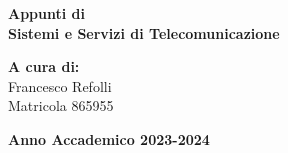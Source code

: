 \documentclass[a4paper,12pt,oneside]{book}
\begin{document}
    
    \begin{titlepage}
        
	\vspace{40mm}
        
	\begin{center}
            {\LARGE{
                    \textbf{Appunti di \\ Sistemi e Servizi di Telecomunicazione}
                    \par
            }}
        \end{center}
        
        \vspace{50mm}

        \begin{flushright}
            {\large \textbf{A cura di:}} \\
            \large{Francesco Refolli} \\
            \large{Matricola 865955} 
        \end{flushright}
        
        \vspace{40mm}
        \begin{center}
            {\large{\bf Anno Accademico 2023-2024}}
        \end{center}

        \restoregeometry
        
    \end{titlepage}
    
    \printindex
    
    
    
    
\end{document}
